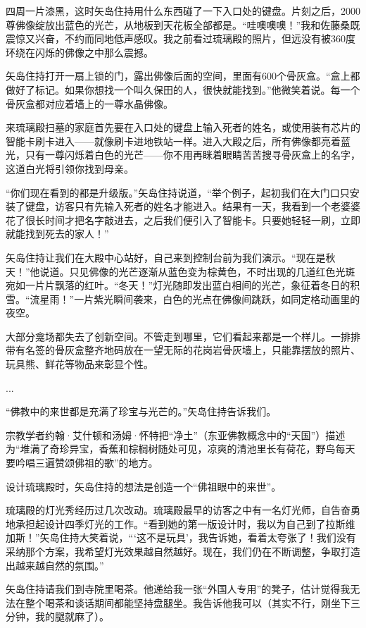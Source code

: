 \documentclass[12pt,oneside]{book}
\begin{document}
\begin{bookref}[frametitle={\cite{好好告别：世界葬礼观察手记}}]
四周一片漆黑，这时矢岛住持用什么东西碰了一下入口处的键盘。片刻之后，2000尊佛像绽放出蓝色的光芒，从地板到天花板全部都是。“哇噢噢噢！”我和佐藤桑既震惊又兴奋，不约而同地低声感叹。我之前看过琉璃殿的照片，但远没有被360度环绕在闪烁的佛像之中那么震撼。

矢岛住持打开一扇上锁的门，露出佛像后面的空间，里面有600个骨灰盒。“盒上都做好了标记。如果你想找一个叫久保田的人，很快就能找到。”他微笑着说。每一个骨灰盒都对应着墙上的一尊水晶佛像。

来琉璃殿扫墓的家庭首先要在入口处的键盘上输入死者的姓名，或使用装有芯片的智能卡刷卡进入——就像刷卡进地铁站一样。进入大殿之后，所有佛像都亮着蓝光，只有一尊闪烁着白色的光芒——你不用再眯着眼睛苦苦搜寻骨灰盒上的名字，这道白光将引领你找到母亲。

“你们现在看到的都是升级版。”矢岛住持说道，“举个例子，起初我们在大门口只安装了键盘，访客只有先输入死者的姓名才能进入。结果有一天，我看到一个老婆婆花了很长时间才把名字敲进去，之后我们便引入了智能卡。只要她轻轻一刷，立即就能找到死去的家人！”

矢岛住持让我们在大殿中心站好，自己来到控制台前为我们演示。“现在是秋天！”他说道。只见佛像的光芒逐渐从蓝色变为棕黄色，不时出现的几道红色光斑宛如一片片飘落的红叶。“冬天！”灯光随即发出蓝白相间的光芒，象征着冬日的积雪。“流星雨！”一片紫光瞬间袭来，白色的光点在佛像间跳跃，如同定格动画里的夜空。

大部分龛场都失去了创新空间。不管走到哪里，它们看起来都是一个样儿。一排排带有名签的骨灰盒整齐地码放在一望无际的花岗岩骨灰墙上，只能靠摆放的照片、玩具熊、鲜花等物品来彰显个性。

...

“佛教中的来世都是充满了珍宝与光芒的。”矢岛住持告诉我们。

宗教学者约翰·艾什顿和汤姆·怀特把“净土”（东亚佛教概念中的“天国”）描述为“堆满了奇珍异宝，香蕉和棕榈树随处可见，凉爽的清池里长有荷花，野鸟每天要吟唱三遍赞颂佛祖的歌”的地方。

设计琉璃殿时，矢岛住持的想法是创造一个“佛祖眼中的来世”。

琉璃殿的灯光秀经历过几次改动。琉璃殿最早的访客之中有一名灯光师，自告奋勇地承担起设计四季灯光的工作。“看到她的第一版设计时，我以为自己到了拉斯维加斯！”矢岛住持大笑着说，“‘这不是玩具’，我告诉她，看着太夸张了！我们没有采纳那个方案，我希望灯光效果越自然越好。现在，我们仍在不断调整，争取打造出越来越自然的氛围。”

矢岛住持请我们到寺院里喝茶。他递给我一张“外国人专用”的凳子，估计觉得我无法在整个喝茶和谈话期间都能坚持盘腿坐。我告诉他我可以（其实不行，刚坐下三分钟，我的腿就麻了）。


\end{bookref}
\end{document}
